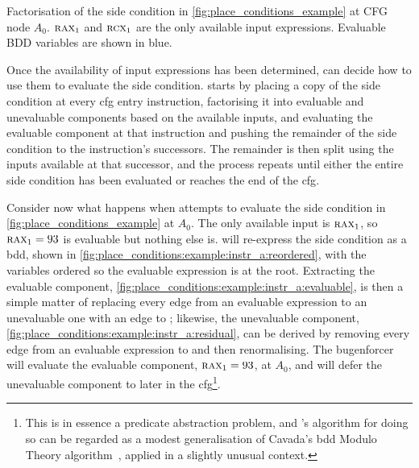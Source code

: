 \begin{sanefig}
{
    \label{fig:place_conditions:example:instr_a:residual}
  }
  \caption{Factorisation of the side condition in
    \autoref{fig:place_conditions_example} at CFG node $A_0$.
    $\textsc{rax}_1$ and $\textsc{rcx}_1$ are the only available input
    expressions.  Evaluable BDD variables are shown in blue.}
  \label{fig:place_conditions_example:instr_a}
\end{sanefig}

\noindent
Once the availability of input expressions has been determined,
{\technique} can decide how to use them to evaluate the side
condition.  {\Technique} starts by placing a copy of the side
condition at every \gls{cfg} entry instruction, factorising it into
evaluable and unevaluable components based on the available inputs,
and evaluating the evaluable component at that instruction and pushing
the remainder of the side condition to the instruction's successors.
The remainder is then split using the inputs available at that
successor, and the process repeats until either the entire side
condition has been evaluated or {\technique} reaches the end of the
\gls{cfg}.

Consider now what happens when {\technique} attempts to evaluate the
side condition in \autoref{fig:place_conditions_example} at $A_0$.
The only available input is $\textsc{rax}_1$, so $\textsc{rax}_1 = 93$
is evaluable but nothing else is.  {\Technique} will re-express the
side condition as a \gls{bdd}, shown in
\autoref{fig:place_conditions:example:instr_a:reordered}, with the
variables ordered so the evaluable expression is at the root.
Extracting the evaluable component,
\autoref{fig:place_conditions:example:instr_a:evaluable}, is then a
simple matter of replacing every edge from an evaluable expression to
an unevaluable one with an edge to \true; likewise, the unevaluable
component, \autoref{fig:place_conditions:example:instr_a:residual},
can be derived by removing every edge from an evaluable expression to
{\false} and then renormalising.  The \gls{bugenforcer} will evaluate
the evaluable component, $\textsc{rax}_1 = 93$, at $A_0$, and will
defer the unevaluable component to later in the
\gls{cfg}\footnote{This is in essence a predicate abstraction problem,
  and {\technique}'s algorithm for doing so can be regarded as a
  modest generalisation of Cavada's \protect\Gls{bdd} Modulo Theory
  algorithm~\cite{cavada2007}, applied in a slightly unusual
  context.}\!\hspace{-.1ex}\!.

